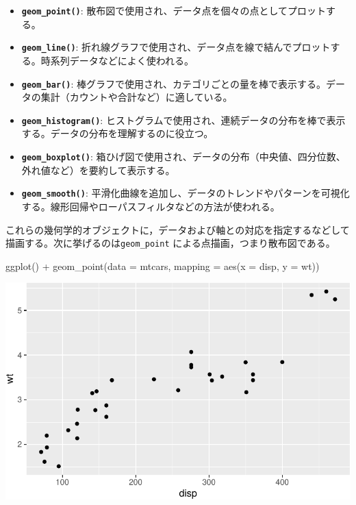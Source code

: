 \documentclass[
  a4paper,
]{ltjsbook}
\newenvironment{Shaded}{\begin{snugshade}}{\end{snugshade}}
\newcommand{\AttributeTok}[1]{\textcolor[rgb]{0.40,0.45,0.13}{#1}}
\newcommand{\FunctionTok}[1]{\textcolor[rgb]{0.28,0.35,0.67}{#1}}
\newcommand{\NormalTok}[1]{\textcolor[rgb]{0.00,0.23,0.31}{#1}}
\newcommand{\SpecialCharTok}[1]{\textcolor[rgb]{0.37,0.37,0.37}{#1}}
\providecommand{\tightlist}{%
  \setlength{\itemsep}{0pt}\setlength{\parskip}{0pt}}\usepackage{longtable,booktabs,array}
\begin{document}
\begin{itemize}
\tightlist
\item
  \textbf{\texttt{geom\_point()}}:
  散布図で使用され、データ点を個々の点としてプロットする。
\item
  \textbf{\texttt{geom\_line()}}:
  折れ線グラフで使用され、データ点を線で結んでプロットする。時系列データなどによく使われる。
\item
  \textbf{\texttt{geom\_bar()}}:
  棒グラフで使用され、カテゴリごとの量を棒で表示する。データの集計（カウントや合計など）に適している。
\item
  \textbf{\texttt{geom\_histogram()}}:
  ヒストグラムで使用され、連続データの分布を棒で表示する。データの分布を理解するのに役立つ。
\item
  \textbf{\texttt{geom\_boxplot()}}:
  箱ひげ図で使用され、データの分布（中央値、四分位数、外れ値など）を要約して表示する。
\item
  \textbf{\texttt{geom\_smooth()}}:
  平滑化曲線を追加し、データのトレンドやパターンを可視化する。線形回帰やローパスフィルタなどの方法が使われる。
\end{itemize}

これらの幾何学的オブジェクトに，データおよび軸との対応を指定するなどして描画する。次に挙げるのは\texttt{geom\_point}
による点描画，つまり散布図である。

\begin{Shaded}
\begin{Highlighting}[]
\FunctionTok{ggplot}\NormalTok{() }\SpecialCharTok{+}
  \FunctionTok{geom\_point}\NormalTok{(}\AttributeTok{data =}\NormalTok{ mtcars, }\AttributeTok{mapping =} \FunctionTok{aes}\NormalTok{(}\AttributeTok{x =}\NormalTok{ disp, }\AttributeTok{y =}\NormalTok{ wt))}
\end{Highlighting}
\end{Shaded}

\includegraphics{chapter04_files/figure-pdf/geom_exam-1.pdf}
\end{document}
